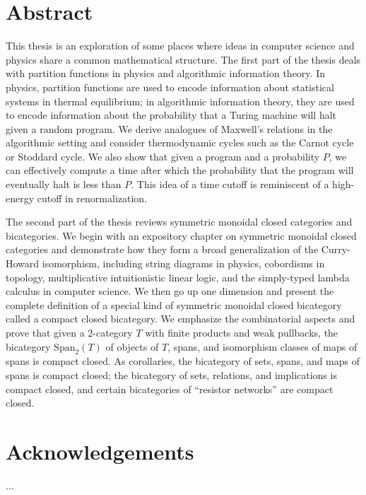 \documentclass[12pt,twoside,openright]{report}
\newcommand{\Span}{\mbox{Span}}
\begin{document}
  \chapter*{Abstract}
This thesis is an exploration of some places where ideas in computer science and physics share a common mathematical structure.  The first part of the thesis deals with partition functions in physics and algorithmic information theory.  In physics, partition functions are used to encode information about statistical systems in thermal equilibrium; in algorithmic information theory, they are used to encode information about the probability that a Turing machine will halt given a random program.  We derive analogues of Maxwell's relations in the algorithmic setting and consider thermodynamic cycles such as the Carnot cycle or Stoddard cycle.  We also show that given a program and a probability $P$, we can effectively compute a time after which the probability that the program will eventually halt is less than $P$.  This idea of a time cutoff is reminiscent of a high-energy cutoff in renormalization.

The second part of the thesis reviews symmetric monoidal closed categories and bicategories.   We begin with an expository chapter on symmetric monoidal closed categories and demonstrate how they form a broad generalization of the Curry-Howard isomorphism, including string diagrams in physics, cobordisms in topology, multiplicative intuitionistic linear logic, and the simply-typed lambda calculus in computer science.  We then go up one dimension and present the complete definition of a special kind of symmetric monoidal closed bicategory called a compact closed bicategory.  We emphasize the combinatorial aspects and prove that given a 2-category $T$ with finite products and weak pullbacks, the bicategory $\Span_2(T)$ of objects of $T$, spans, and isomorphism classes of maps of spans is compact closed.  As corollaries, the bicategory of sets, spans, and maps of spans is compact closed; the bicategory of sets, relations, and implications is compact closed, and certain bicategories of ``resistor networks'' are compact closed.


  \vfill
  \pagebreak

  \chapter*{Acknowledgements}
  ...
  
  \vfill
  \pagebreak

  \tableofcontents
  \vfill
  \pagebreak
\end{document}
